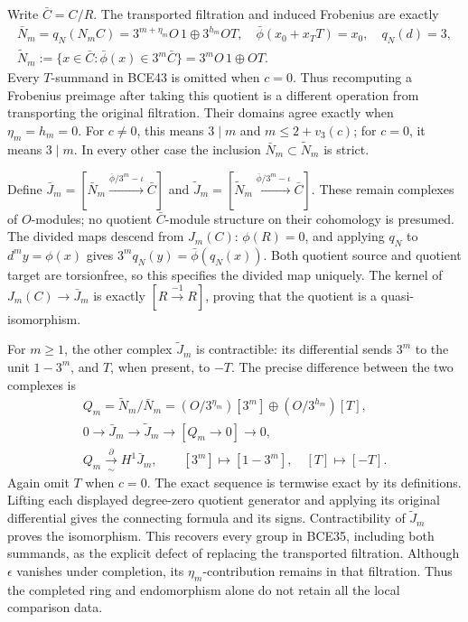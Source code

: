 Write \(\bar C=C/R\). The transported filtration and
induced Frobenius are exactly
\begin{equation}\tag{BCE43}
\begin{gathered}
\bar N_m=q_N(N_mC)
=3^{m+\eta_m}O\,1\oplus3^{h_m}OT,\quad
\bar\phi(x_0+x_TT)=x_0,\quad q_N(d)=3,\\
\widetilde N_m:=\{x\in\bar C:\bar\phi(x)\in3^m\bar C\}
=3^mO\,1\oplus OT .
\end{gathered}
\end{equation}
Every \(T\)-summand in BCE43 is omitted when \(c=0\).
Thus recomputing a Frobenius preimage after taking this
quotient is a different operation from transporting the
original filtration. Their domains agree exactly when
\(\eta_m=h_m=0\). For \(c\ne0\), this means
\(3\mid m\) and \(m\le2+v_3(c)\); for \(c=0\), it
means \(3\mid m\). In every other case the inclusion
\(\bar N_m\subset\widetilde N_m\) is strict.

Define
\(\bar J_m=[\bar N_m\xrightarrow{\bar\phi/3^m-\iota}\bar C]\)
and
\(\widetilde J_m=[\widetilde N_m
\xrightarrow{\bar\phi/3^m-\iota}\bar C]\).
These remain complexes of \(O\)-modules; no quotient
\(\bar C\)-module structure on their cohomology is presumed.
The divided maps descend from \(J_m(C)\): \(\phi(R)=0\),
and applying \(q_N\) to \(d^my=\phi(x)\) gives
\(3^mq_N(y)=\bar\phi(q_N(x))\).
Both quotient source and quotient target are torsionfree,
so this specifies the divided map uniquely.
The kernel of \(J_m(C)\to\bar J_m\) is exactly
\([R\xrightarrow{-1}R]\), proving that the quotient is
a quasi-isomorphism.

For \(m\ge1\), the other complex \(\widetilde J_m\)
is contractible: its differential sends \(3^m\) to the
unit \(1-3^m\), and \(T\), when present, to \(-T\).
The precise difference between the two complexes is
\begin{equation}\tag{BCE44}
\begin{gathered}
Q_m=\widetilde N_m/\bar N_m
=(O/3^{\eta_m})[3^m]\oplus(O/3^{h_m})[T],\\
0\longrightarrow\bar J_m\longrightarrow\widetilde J_m
\longrightarrow[Q_m\longrightarrow0]\longrightarrow0,\\
Q_m\xrightarrow[\sim]{\ \partial\ }H^1\bar J_m,\qquad
[3^m]\longmapsto[1-3^m],\quad[T]\longmapsto[-T].
\end{gathered}
\end{equation}
Again omit \(T\) when \(c=0\).
The exact sequence is termwise exact by its definitions.
Lifting each displayed degree-zero quotient generator and
applying its original differential gives the connecting
formula and its signs. Contractibility of
\(\widetilde J_m\) proves the isomorphism. This recovers
every group in BCE35, including both summands, as the
explicit defect of replacing the transported filtration.
Although \(\epsilon\) vanishes under completion, its
\(\eta_m\)-contribution remains in that filtration.
Thus the completed ring and endomorphism alone do not
retain all the local comparison data.

